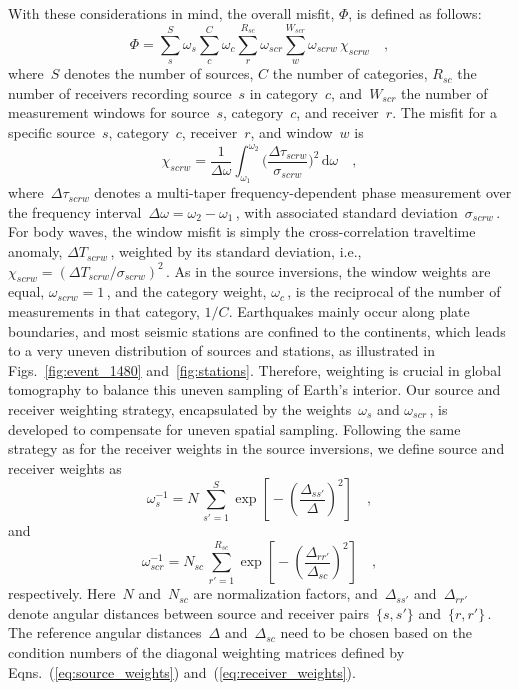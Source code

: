 \documentclass[extra,mreferee]{gji}
\begin{document}
With these considerations in mind,
the overall misfit, $\Phi$, is defined as follows:
\begin{equation}
\label{eq:misfit}
\Phi = \sum_{s}^{S} \omega_s \sum_{c}^{C} \omega_{c} \sum_{r}^{R_{sc}} \omega_{scr} \sum_{w}^{W_{scr}} \omega_{scrw}\, \chi_{scrw}
\quad ,
\end{equation}
where~$S$ denotes the number of sources, $C$ the number of categories,
$R_{sc}$ the number of receivers recording source~$s$ in category~$c$,
and~$W_{scr}$ the number of measurement windows for source~$s$, category~$c$,
and receiver~$r$.
The misfit for a specific source~$s$, category~$c$, receiver~$r$, and window~$w$ is
\begin{equation}
  \chi_{scrw} = \frac{1}{\Delta\omega}\int_{\omega_1}^{\omega_2} \Big( \frac {\Delta \tau_{scrw}} {\sigma_{scrw}} \Big)^2\, \mathrm{d}\omega
\quad ,
\end{equation}
where~$\Delta \tau_{scrw}$ denotes a multi-taper frequency-dependent phase measurement over the frequency interval~$\Delta\omega=\omega_2-\omega_1$\,,
with associated standard deviation~$\sigma_{scrw}$\,.
For body waves, the window misfit is simply the cross-correlation traveltime anomaly,
$\Delta T_{scrw}$\,, weighted by its standard deviation, i.e., $\chi_{scrw}=(\Delta T_{scrw}/\sigma_{scrw})^2$\,.
As in the source inversions,
the window weights are equal, $\omega_{scrw}=1$\,,
and the category weight, $\omega_c$\,, is the reciprocal of the number of measurements in that
category, $1/C$.
Earthquakes mainly occur along plate boundaries,
and most seismic stations are confined to the continents,
which leads to a very uneven distribution of sources and stations,
as illustrated in Figs.~\ref{fig:event_1480} and~\ref{fig:stations}.
Therefore, weighting is crucial in global tomography to balance this uneven sampling
of Earth's interior.
Our source and receiver weighting strategy,
encapsulated by the weights~$\omega_s$ and $\omega_{scr}$\,,
is developed to compensate for uneven spatial sampling.
Following the same strategy as for the receiver weights in the source inversions,
we define source and receiver weights as
\begin{equation}
\omega_{s}^{-1} = N\,\sum_{s'=1}^{S} \exp\left[\mbox{}-\left(\frac{\Delta_{ss'}}{\Delta}\right)^2\right]
\quad ,
\label{eq:source_weights}
\end{equation}
and
\begin{equation}
\omega_{scr}^{-1} = N_{sc}\,\sum_{r'=1}^{R_{sc}} \exp\left[\mbox{}-\left(\frac{\Delta_{rr'}}{\Delta_{sc}}\right)^2\right]
\quad ,
\label{eq:receiver_weights}
\end{equation}
respectively.
Here~$N$ and~$N_{sc}$ are normalization factors,
and~$\Delta_{ss'}$ and~$\Delta_{rr'}$ denote angular distances between source and receiver pairs~$\{s,s'\}$ and~$\{r,r'\}$\,.
The reference angular distances~$\Delta$ and~$\Delta_{sc}$ need to be chosen based on the condition 
numbers of the diagonal weighting matrices defined by Eqns.~(\ref{eq:source_weights}) and~(\ref{eq:receiver_weights}).
\end{document}
